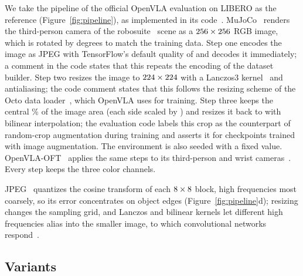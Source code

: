 We take the pipeline of the official OpenVLA evaluation on LIBERO as the reference (Figure~\ref{fig:pipeline}), as implemented in its code~\citep{openvlacode}. MuJoCo~\citep{mujoco} renders the third-person camera of the robosuite~\citep{robosuite} scene as a $256 \times 256$ RGB image, which is rotated by \RotationDeg{} degrees to match the training data. Step one encodes the image as JPEG with TensorFlow's default quality of \JpegQuality{} and decodes it immediately; a comment in the code states that this repeats the encoding of the dataset builder. Step two resizes the image to $224 \times 224$ with a Lanczos3 kernel~\citep{duchon1979} and antialiasing; the code comment states that this follows the resizing scheme of the Octo data loader~\citep{octo}, which OpenVLA uses for training. Step three keeps the central \CropAreaPct\% of the image area (each side scaled by \SideCrop) and resizes it back to \InputRes{} with bilinear interpolation; the evaluation code labels this crop as the counterpart of random-crop augmentation during training and asserts it for checkpoints trained with image augmentation. The environment is also seeded with a fixed value. OpenVLA-OFT~\citep{oft} applies the same steps to its third-person and wrist cameras~\citep{oftcode}. Every step keeps the three color channels.

JPEG~\citep{wallace1992} quantizes the cosine transform of each $8 \times 8$ block, high frequencies most coarsely, so its error concentrates on object edges (Figure~\ref{fig:pipeline}d); resizing changes the sampling grid, and Lanczos and bilinear kernels let different high frequencies alias into the smaller image, to which convolutional networks respond~\citep{azulay2019,zhang2019}.

\subsection{Variants}
\label{sec:variants}

